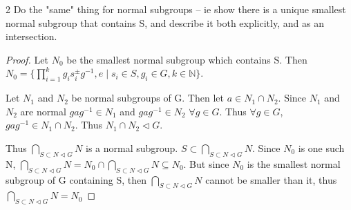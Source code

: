\documentclass{article}
\newcommand{\N}{\mathbb{N}}
\begin{document}
\bigskip

\begin{PROB}{2}\label{Problem 2.}
    Do the "same" thing for normal subgroups -- ie show there is a unique smallest normal subgroup that contains S, and describe it both explicitly, and as an intersection.
\end{PROB}
\begin{proof}
    Let $N_0$ be the smallest normal subgroup which contains S. Then $N_0 = \{\prod_{i = 1}^k g_is_i^{\pm}g^{-1}, e \mid s_i \in S, g_i \in G, k \in \N \}$. 


    Let $N_1$ and $N_2$ be normal subgroups of G. Then let $a \in N_1 \cap N_2$. Since $N_1$ and $N_2$ are normal $gag^{-1} \in N_1$ and $gag^{-1} \in N_2$ $\forall g \in G$. Thus $\forall g \in G$, $gag^{-1} \in N_1 \cap N_2$. Thus $N_1 \cap N_2 \triangleleft G$.


    Thus $\bigcap_{S \subset N \triangleleft G} N$ is a normal subgroup. $S \subset \bigcap_{S \subset N \triangleleft G} N$. Since $N_0$ is one such N, $\bigcap_{S \subset N \triangleleft G} N = N_0 \cap \bigcap_{S \subset N \triangleleft G} N \subseteq N_0$. But since $N_0$ is the smallest normal subgroup of G containing S, then $\bigcap_{S \subset N \triangleleft G} N$ cannot be smaller than it, thus $\bigcap_{S \subset N \triangleleft G} N = N_0$
\end{proof}

\bigskip
\end{document}

